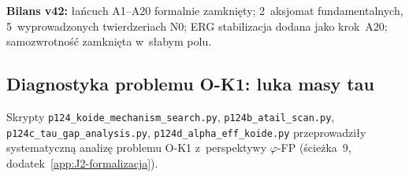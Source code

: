 \noindent
\textbf{Bilans v42:} \l{}a\'ncuch A1--A20 formalnie zamkni\k{e}ty;
2~aksjomat fundamentalnych, 5~wyprowadzonych twierdzeriach N0;
ERG stabilizacja dodana jako krok~A20;
samozwrotno\'s\'c zamkni\k{e}ta w~s\l{}abym polu.

\subsection{Diagnostyka problemu O-K1: luka masy tau}%
\label{app:H-v42plus-tau-gap}

Skrypty \texttt{p124\_koide\_mechanism\_search.py},
\texttt{p124b\_atail\_scan.py}, \texttt{p124c\_tau\_gap\_analysis.py},
\texttt{p124d\_alpha\_eff\_koide.py} przeprowadzi\l{}y
systematyczn\k{a} analiz\k{e} problemu O-K1 z~perspektywy
$\varphi$-FP (\'scie\.zka~9, dodatek~\ref{app:J2-formalizacja}).

